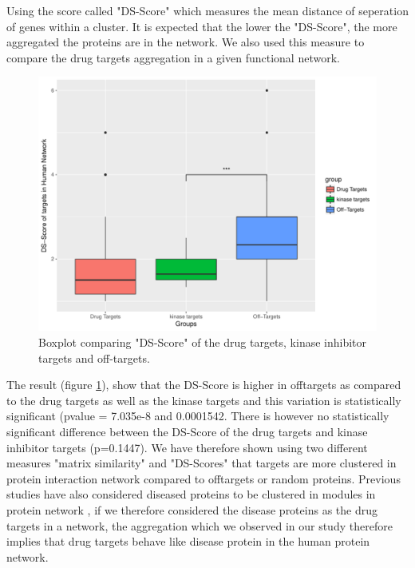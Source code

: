 \documentclass[a4paper, 11pt]{article}
\begin{document}
Using the \cite{menche2015uncovering} score called "DS-Score" which measures the mean distance of seperation of genes within a cluster. It is expected that the lower the "DS-Score", the more aggregated the proteins are in the network. We also used this measure to compare the drug targets aggregation in a given functional network.
\begin{figure}[H]
	\includegraphics[width=\linewidth]{figures/dsboxplot.pdf}
	\centering
	\caption{Boxplot comparing "DS-Score" of the drug targets, kinase inhibitor targets and off-targets.}
		\label{ds_targets}
\end{figure}
The result (figure \ref{ds_targets}), show that the DS-Score is higher in offtargets as compared to the drug targets as well as the kinase targets and this variation is statistically significant (pvalue = 7.035e-8 and 0.0001542. There is however no statistically significant difference between the DS-Score of the drug targets and kinase inhibitor targets (p=0.1447). We have therefore shown using two different measures "matrix similarity" and "DS-Scores" that targets are more clustered in protein interaction network compared to offtargets or random proteins. Previous studies have also considered diseased proteins to be clustered in modules in protein network \cite{menche2015uncovering}, if we therefore considered the disease proteins as the drug targets in a network, the aggregation which we observed in our study therefore implies that drug targets behave like disease protein in the human protein network. 
                                         
\end{document}
